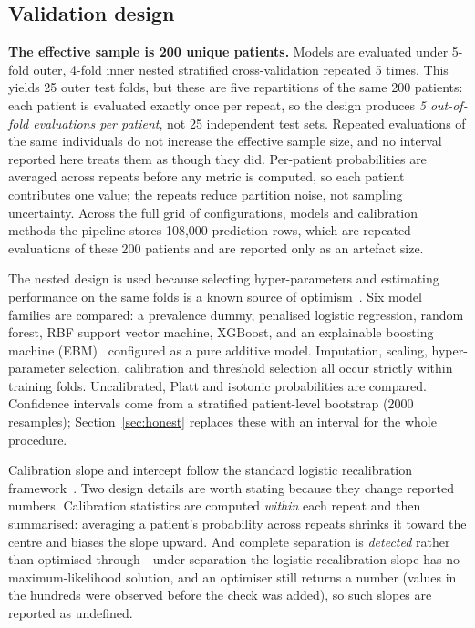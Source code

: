 \documentclass[conference]{IEEEtran}
\begin{document}
\subsection{Validation design}

\textbf{The effective sample is 200 unique patients.} Models are evaluated
under 5-fold outer, 4-fold inner nested stratified cross-validation repeated
5 times. This yields 25 outer test folds, but these are five repartitions of
the same 200 patients: each patient is evaluated exactly once per repeat, so
the design produces \emph{5 out-of-fold evaluations per patient}, not 25
independent test sets. Repeated evaluations of the same individuals do not
increase the effective sample size, and no interval reported here treats them
as though they did. Per-patient probabilities are averaged across repeats
before any metric is computed, so each patient contributes one value; the
repeats reduce partition noise, not sampling uncertainty. Across the full
grid of configurations, models and calibration methods the pipeline stores
108{,}000 prediction rows, which are repeated evaluations of these 200
patients and are reported only as an artefact size.

The nested design is used because selecting hyper-parameters and estimating
performance on the same folds is a known source of optimism~\cite{varma2006}. Six model families are compared: a
prevalence dummy, penalised logistic regression, random forest, RBF support
vector machine, XGBoost, and an explainable boosting machine
(EBM)~\cite{nori2019} configured as a pure additive model. Imputation, scaling, hyper-parameter selection,
calibration and threshold selection all occur strictly within training folds.
Uncalibrated, Platt and isotonic probabilities are compared. Confidence
intervals come from a stratified patient-level bootstrap (2000 resamples);
Section~\ref{sec:honest} replaces these with an interval for the whole
procedure.

Calibration slope and intercept follow the standard logistic recalibration
framework~\cite{vancalster2016}. Two design details are worth stating because
they change reported numbers. Calibration statistics are computed
\emph{within} each repeat and then summarised: averaging a patient's
probability across repeats shrinks it toward the centre and biases the slope
upward. And complete separation is
\emph{detected} rather than optimised through---under separation the logistic
recalibration slope has no maximum-likelihood solution, and an optimiser still
returns a number (values in the hundreds were observed before the check was
added), so such slopes are reported as undefined.
\end{document}
